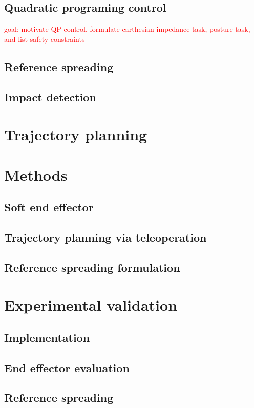 \documentclass[a4paper, 10pt, conference]{ieeeconf}
\begin{document}
    
    \subsection{Quadratic programing control}
     \textcolor{red}{goal: motivate QP control, formulate carthesian impedance task, posture task, and list safety constraints }\\
    \subsection{Reference spreading}
    \subsection{Impact detection}
    \section{Trajectory planning}

    \section{Methods}
    \subsection{Soft end effector}
    \subsection{Trajectory planning via teleoperation}
    \subsection{Reference spreading formulation}

    \section{Experimental validation}
    \subsection{Implementation}
    \subsection{End effector evaluation}
    \subsection{Reference spreading}
\end{document}
